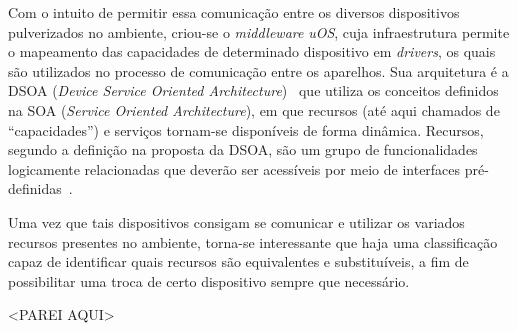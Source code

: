 Com o intuito de permitir essa comunicação entre os diversos dispositivos pulverizados no ambiente, criou-se o \emph{middleware} \emph{uOS}, cuja infraestrutura permite o mapeamento das capacidades de determinado dispositivo em \emph{drivers}, os quais são utilizados no processo de comunicação entre os aparelhos. Sua arquitetura é a DSOA (\emph{Device Service Oriented Architecture})~\cite{buzetoDSOA2010} que utiliza os conceitos definidos na SOA (\emph{Service Oriented Architecture}), em que recursos (até aqui chamados de ``capacidades'') e serviços tornam-se disponíveis de forma dinâmica. Recursos, segundo a definição na proposta da DSOA, são um grupo de funcionalidades logicamente relacionadas que deverão ser acessíveis por meio de interfaces pré-definidas~\cite{buzeto2010}. 

Uma vez que tais dispositivos consigam se comunicar e utilizar os variados recursos presentes no ambiente, torna-se interessante que haja uma classificação capaz de identificar quais recursos são equivalentes e substituíveis, a fim de possibilitar uma troca de certo dispositivo sempre que necessário.



<PAREI AQUI>

